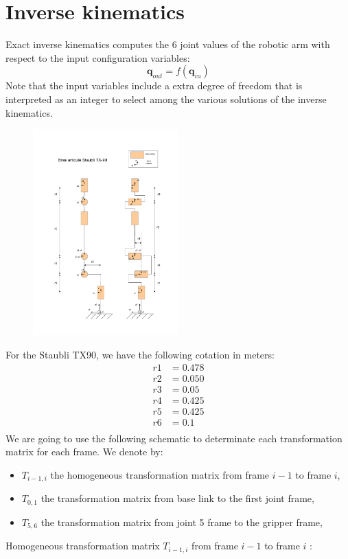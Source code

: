 \documentclass{article}
\newcommand\conf{\mathbf{q}}
\begin{document}
\section{Inverse kinematics}

Exact inverse kinematics computes the 6 joint values of the robotic arm with
respect to the input configuration variables:
\begin{equation}\label{eq:inverse-kinematics}
  \conf_{out} = f(\conf_{in})
\end{equation}
Note that the input variables include a extra degree of freedom that is interpreted as an integer to select among the various solutions of the inverse kinematics.

\begin{figure}[h]
  \centering
  \graphicspath{{./figures/}}
  \includegraphics[width=0.5\textwidth]{staubli-TX90-schematic.pdf}
\end{figure}
For the Staubli TX90, we have the following cotation in meters:
\begin{align*}
  r1&=0.478\\
  r2&=0.050\\
  r3&=0.05\\
  r4&=0.425\\
  r5&=0.425\\
  r6&=0.1\\
\end{align*}
We are going to use the following schematic to determinate each transformation matrix for each frame.
We denote by:
\begin{itemize}
\item $T_{i-1,i}$ the homogeneous transformation matrix from frame $i-1$ to frame $i$,\\
\item $T_{0,1}$ the transformation matrix from base link to the first joint frame,\\
\item $T_{5,6}$ the transformation matrix from joint 5 frame to the gripper frame,\\
\end{itemize}
Homogeneous transformation matrix  $T_{i-1,i}$  from frame $i-1$  to frame $i$  :
\end{document}
